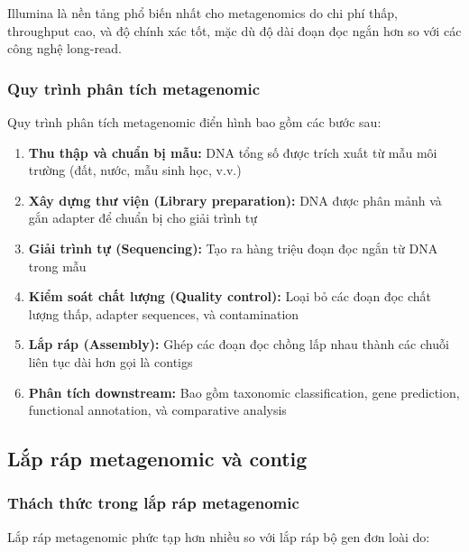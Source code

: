 Illumina là nền tảng phổ biến nhất cho metagenomics do chi phí thấp, throughput cao, và độ chính xác tốt, mặc dù độ dài đoạn đọc ngắn hơn so với các công nghệ long-read.

\subsubsection{Quy trình phân tích metagenomic}

Quy trình phân tích metagenomic điển hình bao gồm các bước sau:

\begin{enumerate}
    \item \textbf{Thu thập và chuẩn bị mẫu:} DNA tổng số được trích xuất từ mẫu môi trường (đất, nước, mẫu sinh học, v.v.)

    \item \textbf{Xây dựng thư viện (Library preparation):} DNA được phân mảnh và gắn adapter để chuẩn bị cho giải trình tự

    \item \textbf{Giải trình tự (Sequencing):} Tạo ra hàng triệu đoạn đọc ngắn từ DNA trong mẫu

    \item \textbf{Kiểm soát chất lượng (Quality control):} Loại bỏ các đoạn đọc chất lượng thấp, adapter sequences, và contamination

    \item \textbf{Lắp ráp (Assembly):} Ghép các đoạn đọc chồng lấp nhau thành các chuỗi liên tục dài hơn gọi là contigs

    \item \textbf{Phân tích downstream:} Bao gồm taxonomic classification, gene prediction, functional annotation, và comparative analysis
\end{enumerate}

\subsection{Lắp ráp metagenomic và contig}

\subsubsection{Thách thức trong lắp ráp metagenomic}

Lắp ráp metagenomic phức tạp hơn nhiều so với lắp ráp bộ gen đơn loài do:

